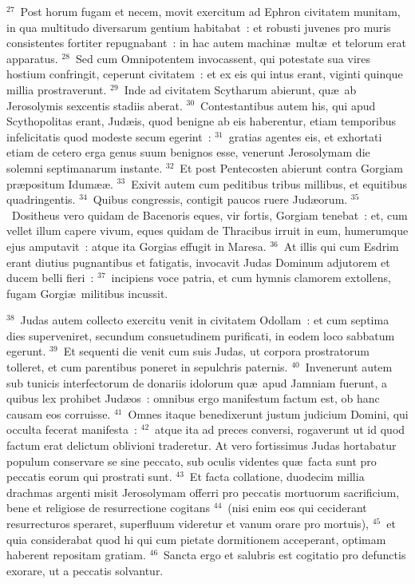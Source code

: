 ${}^{27}$~Post horum fugam et necem, movit exercitum ad Ephron civitatem munitam, in qua multitudo diversarum gentium habitabat~: et robusti juvenes pro muris consistentes fortiter repugnabant~: in hac autem machin\ae\ mult\ae\ et telorum erat apparatus.
${}^{28}$~Sed cum Omnipotentem invocassent, qui potestate sua vires hostium confringit, ceperunt civitatem~: et ex eis qui intus erant, viginti quinque millia prostraverunt.
${}^{29}$~Inde ad civitatem Scytharum abierunt, qu\ae\ ab Jerosolymis sexcentis stadiis aberat.
${}^{30}$~Contestantibus autem his, qui apud Scythopolitas erant, Jud\ae is, quod benigne ab eis haberentur, etiam temporibus infelicitatis quod modeste secum egerint~:
${}^{31}$~gratias agentes eis, et exhortati etiam de cetero erga genus suum benignos esse, venerunt Jerosolymam die solemni septimanarum instante.
${}^{32}$~Et post Pentecosten abierunt contra Gorgiam pr\ae positum Idum\ae \ae .
${}^{33}$~Exivit autem cum peditibus tribus millibus, et equitibus quadringentis.
${}^{34}$~Quibus congressis, contigit paucos ruere Jud\ae orum.
${}^{35}$~Dositheus vero quidam de Bacenoris eques, vir fortis, Gorgiam tenebat~: et, cum vellet illum capere vivum, eques quidam de Thracibus irruit in eum, humerumque ejus amputavit~: atque ita Gorgias effugit in Maresa.
${}^{36}$~At illis qui cum Esdrim erant diutius pugnantibus et fatigatis, invocavit Judas Dominum adjutorem et ducem belli fieri~:
${}^{37}$~incipiens voce patria, et cum hymnis clamorem extollens, fugam Gorgi\ae\ militibus incussit.


${}^{38}$~Judas autem collecto exercitu venit in civitatem Odollam~: et cum septima dies superveniret, secundum consuetudinem purificati, in eodem loco sabbatum egerunt.
${}^{39}$~Et sequenti die venit cum suis Judas, ut corpora prostratorum tolleret, et cum parentibus poneret in sepulchris paternis.
${}^{40}$~Invenerunt autem sub tunicis interfectorum de donariis idolorum qu\ae\ apud Jamniam fuerunt, a quibus lex prohibet Jud\ae os~: omnibus ergo manifestum factum est, ob hanc causam eos corruisse.
${}^{41}$~Omnes itaque benedixerunt justum judicium Domini, qui occulta fecerat manifesta~:
${}^{42}$~atque ita ad preces conversi, rogaverunt ut id quod factum erat delictum oblivioni traderetur. At vero fortissimus Judas hortabatur populum conservare se sine peccato, sub oculis videntes qu\ae\ facta sunt pro peccatis eorum qui prostrati sunt.
${}^{43}$~Et facta collatione, duodecim millia drachmas argenti misit Jerosolymam offerri pro peccatis mortuorum sacrificium, bene et religiose de resurrectione cogitans
${}^{44}$~(nisi enim eos qui ceciderant resurrecturos speraret, superfluum videretur et vanum orare pro mortuis),
${}^{45}$~et quia considerabat quod hi qui cum pietate dormitionem acceperant, optimam haberent repositam gratiam.
${}^{46}$~Sancta ergo et salubris est cogitatio pro defunctis exorare, ut a peccatis solvantur.

